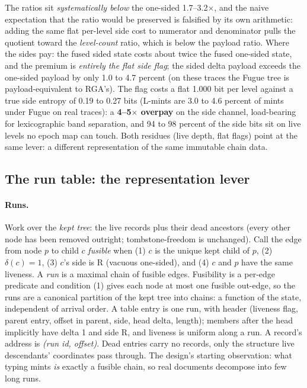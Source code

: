 \documentclass[11pt]{article}
\begin{document}
\noindent The ratios sit \emph{systematically below} the one-sided
1.7--3.2$\times$, and the naive expectation that the ratio would be
preserved is falsified by its own arithmetic: adding the same flat
per-level side cost to numerator and denominator pulls the quotient
toward the \emph{level-count} ratio, which is below the payload ratio.
Where the sides pay: the fused sided state costs about twice the fused
one-sided state, and the premium is \emph{entirely the flat side flag};
the sided delta payload exceeds the one-sided payload by only 1.0 to
4.7 percent (on these traces the Fugue tree is payload-equivalent to
RGA's). The flag costs a flat 1.000 bit per level against a true side
entropy of 0.19 to 0.27 bits (L-mints are 3.0 to 4.6 percent of mints
under Fugue on real traces): a \textbf{4--5$\times$ overpay} on the
side channel, load-bearing for lexicographic band separation, and 94 to
98 percent of the side bits sit on live levels no epoch map can touch.
Both residues (live depth, flat flags) point at the same lever: a
different representation of the same immutable chain data.

\subsection{The run table: the representation lever}
\label{sec:runtable}

\paragraph{Runs.} Work over the \emph{kept tree}: the live records plus
their dead ancestors (every other node has been removed outright;
tombstone-freedom is unchanged). Call the edge from node $p$ to child
$c$ \emph{fusible} when (1) $c$ is the unique kept child of $p$, (2)
$\delta(c) = 1$, (3) $c$'s side is R (vacuous one-sided), and (4) $c$
and $p$ have the same liveness. A \emph{run} is a maximal chain of
fusible edges. Fusibility is a per-edge predicate and condition (1)
gives each node at most one fusible out-edge, so the runs are a
canonical partition of the kept tree into chains: a function of the
state, independent of arrival order. A table entry is one run, with
header (liveness flag, parent entry, offset in parent, side, head
delta, length); members after the head implicitly have delta 1 and side
R, and liveness is uniform along a run. A record's address is
\emph{(run id, offset)}. Dead entries carry no records, only the
structure live descendants' coordinates pass through. The design's
starting observation: what typing mints \emph{is} exactly a fusible
chain, so real documents decompose into few long runs.
\end{document}
